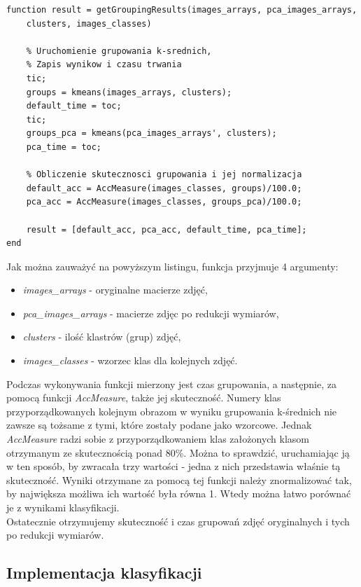 \vspace{5mm} 

\begin{lstlisting}[linewidth=16.0cm]
function result = getGroupingResults(images_arrays, pca_images_arrays, 
	clusters, images_classes)
	
	% Uruchomienie grupowania k-srednich,
	% Zapis wynikow i czasu trwania
	tic;
	groups = kmeans(images_arrays, clusters);
	default_time = toc;
	tic;
	groups_pca = kmeans(pca_images_arrays', clusters);
	pca_time = toc;
	
	% Obliczenie skutecznosci grupowania i jej normalizacja
	default_acc = AccMeasure(images_classes, groups)/100.0;
	pca_acc = AccMeasure(images_classes, groups_pca)/100.0;
	
	result = [default_acc, pca_acc, default_time, pca_time];
end
\end{lstlisting}

\vspace{5mm} 

Jak można zauważyć na powyższym listingu, funkcja przyjmuje 4 argumenty:
\begin{itemize}
	\item \textit{images\_arrays} - oryginalne macierze zdjęć,
	\item \textit{pca\_images\_arrays} - macierze zdjęc po redukcji wymiarów,
	\item \textit{clusters} - ilość klastrów (grup) zdjęć,
	\item \textit{images\_classes} - wzorzec klas dla kolejnych zdjęć.
\end{itemize}
Podczas wykonywania funkcji mierzony jest czas grupowania, a następnie, za pomocą funkcji \textit{AccMeasure}, także jej skuteczność. Numery klas przyporządkowanych kolejnym obrazom w wyniku grupowania k-średnich nie zawsze są tożsame z tymi, które zostały podane jako wzorcowe. Jednak \textit{AccMeasure} radzi sobie z przyporządkowaniem klas założonych klasom otrzymanym ze skutecznością ponad 80\%. Można to sprawdzić, uruchamiając ją w ten sposób, by zwracała trzy wartości - jedna z nich przedstawia właśnie tą skuteczność. Wyniki otrzymane za pomocą tej funkcji należy znormalizować tak, by największa możliwa ich wartość była równa 1. Wtedy można łatwo porównać je z wynikami klasyfikacji.\\
Ostatecznie otrzymujemy skuteczność i czas grupowań zdjęć oryginalnych i tych po redukcji wymiarów.

\subsection{Implementacja klasyfikacji}

